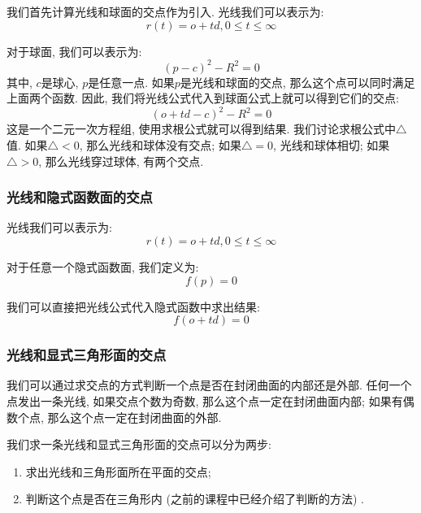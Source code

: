 \documentclass[openany]{progbookcn}
\begin{document}
我们首先计算光线和球面的交点作为引入. 光线我们可以表示为: 
\begin{equation}
	r(t)=o+td, 0\le t \le \infty
\end{equation}

对于球面, 我们可以表示为: 
\begin{equation}
	(p-c)^2-R^2=0
\end{equation}其中, $c$是球心, $p$是任意一点. 如果$p$是光线和球面的交点, 那么这个点可以同时满足上面两个函数. 因此, 我们将光线公式代入到球面公式上就可以得到它们的交点: 
\begin{equation}
	(o+td-c)^2-R^2=0
\end{equation}
这是一个二元一次方程组, 使用求根公式就可以得到结果. 我们讨论求根公式中$\triangle$值. 如果$\triangle < 0$, 那么光线和球体没有交点; 如果$\triangle = 0$, 光线和球体相切; 如果$\triangle > 0$, 那么光线穿过球体, 有两个交点. 

\subsubsection{光线和隐式函数面的交点}

光线我们可以表示为: 
\begin{equation}
	r(t)=o+td, 0\le t \le \infty
\end{equation}

对于任意一个隐式函数面, 我们定义为: 
\begin{equation}
	f(p)=0
\end{equation}

我们可以直接把光线公式代入隐式函数中求出结果: 
\begin{equation}
	f(o+td)=0
\end{equation}

\subsubsection{光线和显式三角形面的交点}
我们可以通过求交点的方式判断一个点是否在封闭曲面的内部还是外部. 任何一个点发出一条光线, 如果交点个数为奇数, 那么这个点一定在封闭曲面内部; 如果有偶数个点, 那么这个点一定在封闭曲面的外部. 

我们求一条光线和显式三角形面的交点可以分为两步: 
\begin{enumerate}
	\item 求出光线和三角形面所在平面的交点; 
	\item 判断这个点是否在三角形内 (之前的课程中已经介绍了判断的方法) . 
\end{enumerate}
\end{document}
